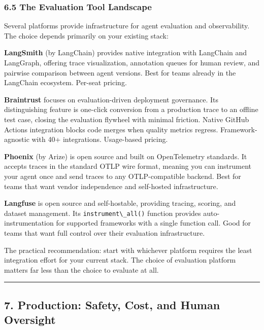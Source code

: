 \documentclass[11pt, a4paper]{article}
\newcommand{\passthrough}[1]{#1}
\begin{document}
\hypertarget{the-evaluation-tool-landscape}{%
\subsubsection{6.5 The Evaluation Tool
Landscape}\label{the-evaluation-tool-landscape}}

Several platforms provide infrastructure for agent evaluation and
observability. The choice depends primarily on your existing stack:

\textbf{LangSmith} (by LangChain) provides native integration with
LangChain and LangGraph, offering trace visualization, annotation queues
for human review, and pairwise comparison between agent versions. Best
for teams already in the LangChain ecosystem. Per-seat pricing.

\textbf{Braintrust} focuses on evaluation-driven deployment governance.
Its distinguishing feature is one-click conversion from a production
trace to an offline test case, closing the evaluation flywheel with
minimal friction. Native GitHub Actions integration blocks code merges
when quality metrics regress. Framework-agnostic with 40+ integrations.
Usage-based pricing.

\textbf{Phoenix} (by Arize) is open source and built on OpenTelemetry
standards. It accepts traces in the standard OTLP wire format, meaning
you can instrument your agent once and send traces to any
OTLP-compatible backend. Best for teams that want vendor independence
and self-hosted infrastructure.

\textbf{Langfuse} is open source and self-hostable, providing tracing,
scoring, and dataset management. Its
\passthrough{\lstinline!instrument\_all()!} function provides
auto-instrumentation for supported frameworks with a single function
call. Good for teams that want full control over their evaluation
infrastructure.

The practical recommendation: start with whichever platform requires the
least integration effort for your current stack. The choice of
evaluation platform matters far less than the choice to evaluate at all.

\begin{center}\rule{0.5\linewidth}{0.5pt}\end{center}

\hypertarget{production-safety-cost-and-human-oversight}{%
\subsection{7. Production: Safety, Cost, and Human
Oversight}\label{production-safety-cost-and-human-oversight}}
\end{document}
